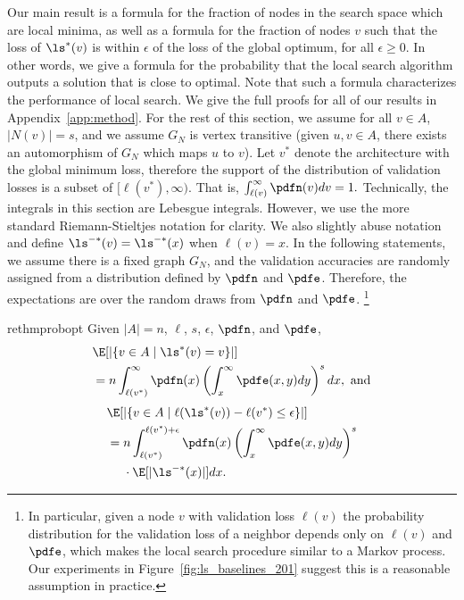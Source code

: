 Our main result is a formula for the fraction of nodes in the search space which 
are local minima, as well as a formula for the fraction of nodes $v$ 
such that the loss of $\ls^*(v)$ 
is within $\epsilon$ of the loss of the global optimum, for all $\epsilon\geq 0.$
In other words, we give a formula for the probability that the local search algorithm 
outputs a solution that is close to optimal.
Note that such a formula characterizes the performance of local search.
We give the full proofs for all of our results 
in Appendix~\ref{app:method}.
For the rest of this section, 
we assume for all $v \in A$, $|N(v)|=s$, and
we assume $G_N$ is vertex transitive
(given $u,v\in A$, there exists an automorphism of $G_N$ which maps $u$ to $v$).
Let $v^*$ denote the architecture with the global minimum loss, therefore
the support of the distribution of validation losses is a subset of $[\ell(v^*),\infty).$ 
That is, $\int_{\ell(v)}^\infty \pdfn(v)dv=1.$ 
Technically, the integrals in this section are Lebesgue integrals. However, we use the more standard Riemann-Stieltjes notation for clarity. We also slightly abuse notation and
define $\ls^{-*}(v)=\ls^{-*}(x)$ when $\ell(v)=x.$
In the following statements, we assume there is a fixed graph $G_N$, and the 
validation accuracies are randomly assigned from a distribution defined by $\pdfn$ 
and $\pdfe$. Therefore, the expectations are over the random draws from $\pdfn$ and $\pdfe$.
\footnote{
In particular, given a node $v$ with validation loss $\ell(v)$
the probability distribution for the validation loss of a neighbor depends only 
on $\ell(v)$ and $\pdfe$, which makes the local search procedure similar to a 
Markov process.  Our experiments in Figure~\ref{fig:ls_baselines_201}
suggest this is a reasonable assumption in practice.
}


\begin{restatable}{rethm}{probopt}\label{thm:prob_opt}
Given $|A| = n$, $\ell$, $s$, $\epsilon$, $\pdfn$, and $\pdfe$,
\begin{align*}
&\E[|\{v \in A\mid \ls^*(v) = v\}|]\\
&=n \int_{\ell(v^*)}^\infty \pdfn(x) 
\left(\int_{x}^\infty \pdfe(x, y) dy \right)^s dx,\text{ and}
\end{align*}
\begin{align*}
&\E[|\{v \in A\mid \ell(\ls^*(v))-\ell(v^*)\leq\epsilon\}|]\\
&=n \int_{\ell(v^*)}^{\ell(v^*)+\epsilon}
\pdfn(x)\left(\int_{x}^\infty \pdfe(x,y) dy\right)^s\\
&\quad~\cdot\E[|\ls^{-*}(x)|]dx.
\end{align*}
\end{restatable}


